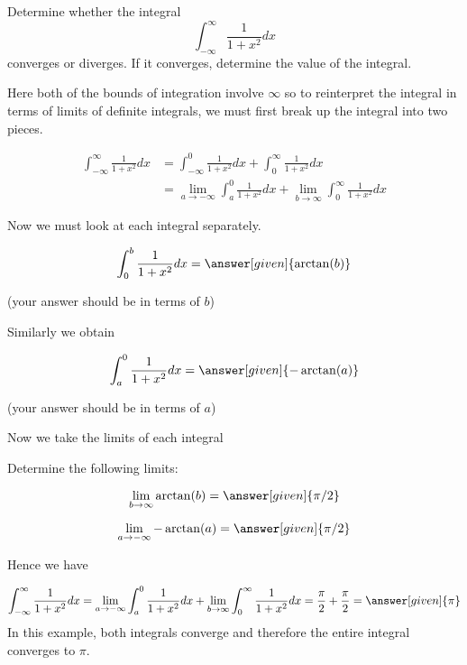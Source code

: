 \documentclass{ximera}
\begin{document}
\begin{example}
Determine whether the integral
\[
\int_{-\infty}^{\infty} \frac{1}{1+x^2} dx 
\]
converges or diverges. If it converges, determine the value of the integral. 
\begin{explanation}
Here both of the bounds of integration involve $\infty$ so to reinterpret the integral in terms of limits of definite integrals, 
we must first break up the integral into two pieces.

\begin{align*}
\int_{-\infty}^{\infty} \frac{1}{1+x^2} dx&= \int_{-\infty}^{0} \frac{1}{1+x^2} dx + \int_{0}^{\infty} \frac{1}{1+x^2} dx \\
& =\lim_{a \to -\infty} \int_{a}^{0} \frac{1}{1+x^2} dx + \lim_{b \to \infty} \int_{0}^{\infty} \frac{1}{1+x^2} dx 
\end{align*}
 
Now we must look at each integral separately. 

\[
\int_{0}^{b} \frac{1}{1+x^2} dx =  \answer[given]{\arctan(b)}
\]
\begin{onlineOnly}
(your answer should be in terms of $b$)
\end{onlineOnly}
Similarly we obtain

\[
\int_{a}^{0} \frac{1}{1+x^2} dx= \answer[given]{-\arctan(a)}
\]
\begin{onlineOnly}
 (your answer should be in terms of $a$)
 \end{onlineOnly}

Now we take the limits of each integral

\begin{question}
Determine the following limits:

 \begin{prompt}
   \[
    \lim_{b\to\infty} \arctan(b) = \answer[given]{\pi/2}
    \]

\[
\lim_{a \to -\infty} -\arctan(a)=\answer[given]{\pi/2}
\]
  \end{prompt}
\end{question}

Hence we have

\[
\int_{-\infty}^{\infty} \frac{1}{1+x^2} dx=\lim_{a \to -\infty} \int_{a}^{0} \frac{1}{1+x^2} dx + \lim_{b \to \infty} \int_{0}^{\infty} \frac{1}{1+x^2} dx =\frac{\pi}{2}+\frac{\pi}{2} = \answer[given]{\pi}\]
In this example, both integrals converge and therefore the entire integral converges to $\pi$. 
\end{explanation}
\end{example}
\end{document}

